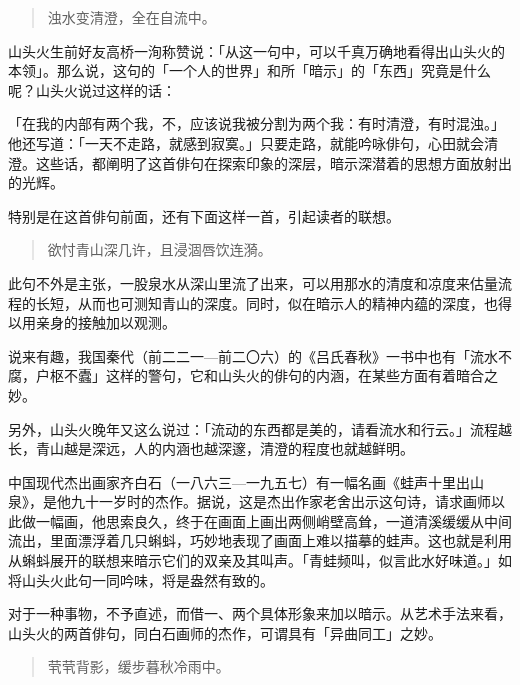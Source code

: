 {

\begin{quote}        浊水变清澄，全在自流中。
\end{quote}

山头火生前好友高桥一洵称赞说：「从这一句中，可以千真万确地看得出山头火的本领」\footnotemark[5]。那么说，这句的「一个人的世界」和所「暗示」的「东西」究竟是什么呢？山头火说过这样的话：


「在我的内部有两个我，不，应该说我被分割为两个我：有时清澄，有时混浊。」他还写道：「一天不走路，就感到寂寞。」只要走路，就能吟咏俳句，心田就会清澄\footnotemark[6]。这些话，都阐明了这首俳句在探索印象的深层，暗示深潜着的思想方面放射出的光辉。


特别是在这首俳句前面，还有下面这样一首，引起读者的联想。

\begin{quote}
    欲忖青山深几许，且浸涸唇饮连漪。
\end{quote}

此句不外是主张，一股泉水从深山里流了出来，可以用那水的清度和凉度来估量流程的长短，从而也可测知青山的深度。同时，似在暗示人的精神内蕴的深度，也得以用亲身的接触加以观测。

说来有趣，我国秦代（前二二一—前二〇六）的《吕氏春秋》一书中也有「流水不腐，户枢不蠹」这样的警句，它和山头火的俳句的内涵，在某些方面有着暗合之妙。

另外，山头火晚年又这么说过：「流动的东西都是美的，请看流水和行云。」流程越长，青山越是深远，人的内涵也越深邃，清澄的程度也就越鲜明。

中国现代杰出画家齐白石（一八六三—一九五七）有一幅名画《蛙声十里出山泉》，是他九十一岁时的杰作。据说，这是杰出作家老舍出示这句诗，请求画师以此做一幅画，他思索良久，终于在画面上画出两侧峭壁高耸，一道清溪缓缓从中间流出，里面漂浮着几只蝌蚪，巧妙地表现了画面上难以描摹的蛙声。这也就是利用从蝌蚪展开的联想来暗示它们的双亲及其叫声。「青蛙频叫，似言此水好味道。」如将山头火此句一同吟味，将是盎然有致的。

对于一种事物，不予直述，而借一、两个具体形象来加以暗示。从艺术手法来看，山头火的两首俳句，同白石画师的杰作，可谓具有「异曲同工」之妙。

\begin{quote}
    茕茕背影，缓步暮秋冷雨中。
\end{quote}

}
